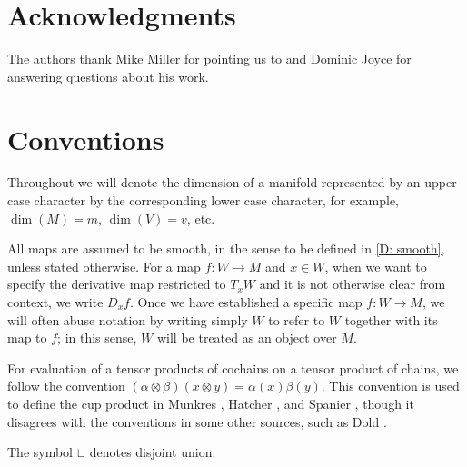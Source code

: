 \section*{Acknowledgments}

The authors thank Mike Miller for pointing us to \cite{Lipy14} and Dominic Joyce for answering questions about his work.

\section*{Conventions}

Throughout we will denote the dimension of a manifold represented by an upper case character by the corresponding lower case character, for example, $\dim(M) = m$, $\dim(V) = v$, etc.

All maps are assumed to be smooth, in the sense to be defined in \cref{D: smooth}, unless stated otherwise.
For a map $f \colon W \to M$ and $x \in W$, when we want to specify the derivative map restricted to $T_xW$ and it is not otherwise clear from context, we write $D_xf$.
Once we have established a specific map $f \colon W \to M$, we will often abuse notation by writing simply $W$ to refer to $W$ together with its map to $f$; in this sense, $W$ will be treated as an object over $M$.

For evaluation of a tensor products of cochains on a tensor product of chains, we follow the convention $(\alpha \otimes \beta)(x\otimes y) = \alpha(x)\beta(y)$.
This convention is used to define the cup product in Munkres \cite[Section 60]{Mun84}, Hatcher \cite[Section 3.2]{Hatc02}, and Spanier \cite[Section 5.6]{Span81}, though it disagrees with the conventions in some other sources, such as Dold \cite[Section VII.7]{Dol72}.

The symbol $\sqcup$ denotes disjoint union.